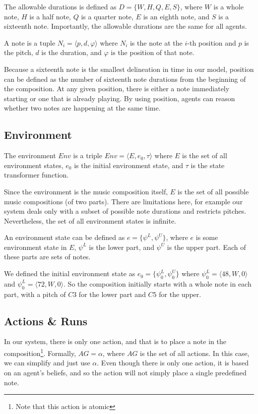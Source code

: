 \documentclass[12pt]{article}
\begin{document}
	The allowable durations is defined as
	$D = \{W, H, Q, E, S \}$,
	where $W$ is a whole note, $H$ is a half note, $Q$ is a quarter note, $E$ is an eighth note, and $S$ is a sixteenth note. Importantly, the allowable durations are the same for all agents.
	
	A note is a tuple
	$N_i = \langle p,d,\varphi \rangle$
	where $N_i$ is the note at the $i$-th position and $p$ is the pitch, $d$ is the duration, and $\varphi$ is the position of that note.
	
	Because a sixteenth note is the smallest delineation in time in our model, position can be defined as the number of sixteenth note durations from the beginning of the composition. At any given position, there is either a note immediately starting or one that is already playing. By using position, agents can reason whether two notes are happening at the same time.
	
	\subsection{Environment}
	The environment $Env$ is a triple
	$Env = \langle E, e_0, \tau \rangle$
	where $E$ is the set of all environment states, $e_0$ is the initial environment state, and $\tau$ is the state transformer function.
	
	Since the environment is the music composition itself, $E$ is the set of all possible music compositions (of two parts). There are limitations here, for example our system deals only with a subset of possible note durations and restricts pitches. Nevertheless, the set of all environment states is infinite.
	
	An environment state can be defined as
	$e = \{\psi^L, \psi^U\}$, where $e$ is some environment state in $E$, $\psi^L$ is the lower part, and $\psi^U$ is the upper part. Each of these parts are sets of notes.
	
	We defined the initial environment state as $e_0 = \{\psi^L_0, \psi^U_0\}$ where 
	$\psi^L_0 = {\langle 48,W,0 \rangle}$ and $\psi^L_0 = {\langle 72,W,0 \rangle}$.
	So the composition initially starts with a whole note in each part, with a pitch of $C3$ for the lower part and $C5$ for the upper.
	
	\subsection{Actions \& Runs}
	In our system, there is only one action, and that is to place a note in the composition\footnote{Note that this action is atomic}. Formally, $AG = {\alpha}$, where $AG$ is the set of all actions. In this case, we can simplify and just use $\alpha$. Even though there is only one action, it is based on an agent's beliefs, and so the action will not simply place a single predefined note.
	
\end{document}
